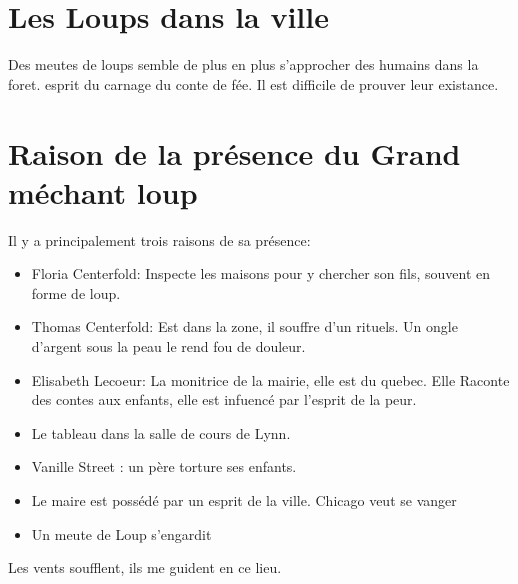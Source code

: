 \documentclass[oneside,12pt]{book}
\begin{document}
\begin{flushleft}
\section{Les Loups dans la ville}
Des meutes de loups semble de plus en plus s'approcher des humains dans la foret. esprit du carnage du conte de fée. 
Il est difficile de prouver leur existance. 


\section{Raison de la présence du Grand méchant loup}
Il y a principalement trois raisons de sa présence: 
\begin{itemize}
\item Floria Centerfold: Inspecte les maisons pour y chercher son fils, souvent en forme de loup. 
\item Thomas Centerfold: Est dans la zone, il souffre d'un rituels. Un ongle d'argent sous la peau le rend fou de douleur.
\item Elisabeth Lecoeur: La monitrice de la mairie, elle est du quebec. Elle Raconte des contes aux enfants, elle est infuencé par l'esprit de la peur.
\item Le tableau dans la salle de cours de Lynn. 
\item Vanille Street : un père torture ses enfants. 
\item Le maire est possédé par un esprit de la ville. Chicago veut se vanger
\item Un meute de Loup s'engardit 
\end{itemize}
Les vents soufflent, ils me guident en ce lieu. 

\end{flushleft}
\end{document}
